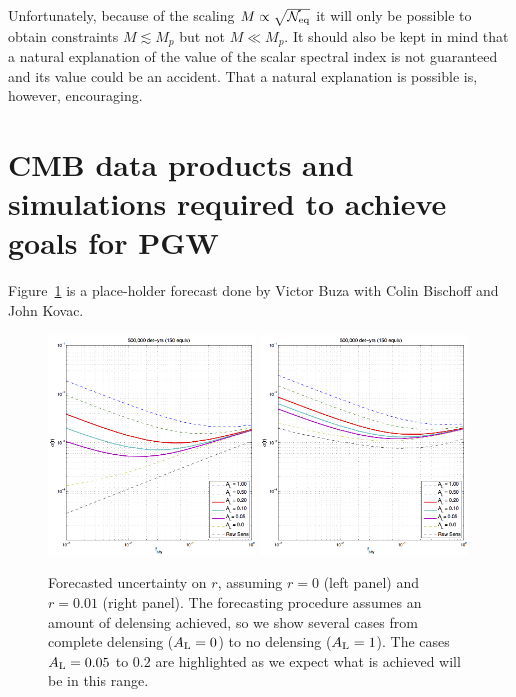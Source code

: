 Unfortunately, because of the scaling $M\propto \sqrt{\mathcal{N}_{\rm eq}}$ it will only be possible to obtain constraints $M\lesssim M_p$ but not $M\ll M_p$. It should also be kept in mind that a natural explanation of the value of the scalar spectral index is not guaranteed and its value could be an accident. That a natural explanation is possible is, however, encouraging.

\section{CMB data products and simulations required to achieve goals for PGW}
\label{sec:needs}

Figure~\ref{fig_rforecast} is a place-holder forecast done by Victor Buza with Colin Bischoff and John Kovac.

\begin{figure}[ht]
\centering
\includegraphics[width=0.49\textwidth]{Inflation/sigr2_fsky_rx1e3_r0.png}
\includegraphics[width=0.49\textwidth]{Inflation/sigr2_fsky_rx1e3_r01.png}
\caption{Forecasted uncertainty on $r$, assuming $r=0$ (left panel) and $r=0.01$ (right panel). The forecasting procedure assumes
an amount of delensing achieved, so we show several cases from complete delensing ($A_{\rm L} = 0$) to no delensing ($A_{\rm L} = 1$). The cases $A_{\rm L} = 0.05$ to $0.2$ are highlighted as we expect what is achieved will be in this range.}
\label{fig_rforecast}
\end{figure}



